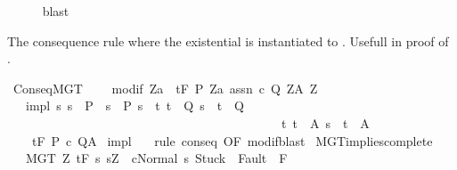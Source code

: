 \begin{isabellebody}
\ \ \ \ \isamarkupfalse%
\ blast\isanewline
{}\isamarkupfalse%
%
\endisatagproof
{\isafoldproof}%
%
\isadelimproof
%
\endisadelimproof
%
\begin{isamarkuptext}%
The consequence rule where the existential  is instantiated
to . Usefull in proof of .%
\end{isamarkuptext}\isamarkuptrue%
\isamarkupfalse%
\ ConseqMGT{\isacharcolon}\ \isanewline
\ \ \ modif{\isacharcolon}\ {\isachardoublequoteopen}{\isasymforall}Z{\isacharcolon}{\isacharcolon}{\isacharprime}a{\isachardot}\ {\isasymGamma}{\isacharcomma}{\isasymTheta}\ {\isasymturnstile}\isactrlsub t\isactrlbsub {\isacharslash}F\isactrlesub \ {\isacharparenleft}P{\isacharprime}\ Z{\isacharcolon}{\isacharcolon}{\isacharprime}a\ assn{\isacharparenright}\ c\ {\isacharparenleft}Q{\isacharprime}\ Z{\isacharparenright}{\isacharcomma}{\isacharparenleft}A{\isacharprime}\ Z{\isacharparenright}{\isachardoublequoteclose}\isanewline
\ \ \ impl{\isacharcolon}\ {\isachardoublequoteopen}{\isasymAnd}s{\isachardot}\ s\ {\isasymin}\ P\ {\isasymLongrightarrow}\ s\ {\isasymin}\ P{\isacharprime}\ s\ {\isasymand}\ {\isacharparenleft}{\isasymforall}t{\isachardot}\ t\ {\isasymin}\ Q{\isacharprime}\ s\ {\isasymlongrightarrow}\ t\ {\isasymin}\ Q{\isacharparenright}\ {\isasymand}\ \isanewline
\ \ \ \ \ \ \ \ \ \ \ \ \ \ \ \ \ \ \ \ \ \ \ \ \ \ \ \ \ \ \ \ \ \ \ \ \ \ \ \ \ \ \ \ {\isacharparenleft}{\isasymforall}t{\isachardot}\ t\ {\isasymin}\ A{\isacharprime}\ s\ {\isasymlongrightarrow}\ t\ {\isasymin}\ A{\isacharparenright}{\isachardoublequoteclose}\isanewline
\ \ \ {\isachardoublequoteopen}{\isasymGamma}{\isacharcomma}{\isasymTheta}\ {\isasymturnstile}\isactrlsub t\isactrlbsub {\isacharslash}F\isactrlesub \ P\ c\ Q{\isacharcomma}A{\isachardoublequoteclose}\isanewline
%
\isadelimproof
%
\endisadelimproof
%
\isatagproof
{}\isamarkupfalse%
\ impl\ \isanewline
{}\isamarkupfalse%
\ {\isacharminus}\ {\isacharparenleft}rule\ conseq\ {\isacharbrackleft}OF\ modif{\isacharbrackright}{\isacharcomma}blast{\isacharparenright}%
\endisatagproof
{\isafoldproof}%
%
\isadelimproof
\isanewline
%
\endisadelimproof
\isanewline
{}\isamarkupfalse%
\ MGT{\isacharunderscore}implies{\isacharunderscore}complete{\isacharcolon}\isanewline
\ \ \ MGT{\isacharcolon}\ {\isachardoublequoteopen}{\isasymforall}Z{\isachardot}\ {\isasymGamma}{\isacharcomma}{\isacharbraceleft}{\isacharbraceright}{\isasymturnstile}\isactrlsub t\isactrlbsub {\isacharslash}F\isactrlesub \ {\isacharbraceleft}s{\isachardot}\ s{\isacharequal}Z\ {\isasymand}\ {\isasymGamma}{\isasymturnstile}{\isasymlangle}c{\isacharcomma}Normal\ s{\isasymrangle}\ {\isasymRightarrow}{\isasymnotin}{\isacharparenleft}{\isacharbraceleft}Stuck{\isacharbraceright}\ {\isasymunion}\ Fault\ {\isacharbackquote}\ {\isacharparenleft}{\isacharminus}F{\isacharparenright}{\isacharparenright}\ {\isasymand}\ \isanewline

\end{isabellebody}
